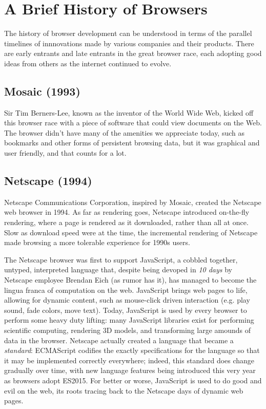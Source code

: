 \documentclass[a4paper, 11pt]{article} %
\begin{document}
\section{A Brief History of Browsers}

The history of browser development can be understood in terms of the parallel timelines of innnovations made by various companies and their products. There are early entrants and late entrants in the great browser race, each adopting good ideas from others as the internet continued to evolve. \cite{evolution-of-the-web}

\subsection{Mosaic (1993)}

Sir Tim Berners-Lee, known as the inventor of the World Wide Web, kicked off this browser race with a piece of software that could view documents on the Web. The browser didn't have many of the amenities we appreciate today, such as bookmarks and other forms of persistent browsing data, but it was graphical and user friendly, and that counts for a lot. \cite{Frequ89:online, evolution-of-the-web}

\subsection{Netscape (1994)}

Netscape Communications Corporation, inspired by Mosaic, created the Netscape web browser in 1994. As far as rendering goes, Netscape introduced on-the-fly rendering, where a page is rendered as it downloaded, rather than all at once. Slow as download speed were at the time, the incremental rendering of Netscape made browsing a more tolerable experience for 1990s users. \cite{Remem57:online}

The Netscape browser was first to support JavaScript, a cobbled together, untyped, interpreted language that, despite being devoped in \textit{10 days} by Netscape employee Brendan Eich (as rumor has it), has managed to become the lingua franca of computation on the web. JavaScript brings web pages to life, allowing for dynamic content, such as mouse-click driven interaction (e.g. play sound, fade colors, move text). Today, JavaScript is used by every browser to perform some heavy duty lifting: many JavaScript libraries exist for performing scientific computing, rendering 3D models, and transforming large amounds of data in the browser. Netscape actually created a language that became a \textit{standard}: ECMAScript codifies the exactly specifications for the language so that it may be implemented correctly everywhere; indeed, this standard does change gradually over time, with new language features being introduced this very year as browsers adopt ES2015. For better or worse, JavaScript is used to do good and evil on the web, its roots tracing back to the Netscape days of dynamic web pages. \cite{evolution-of-the-web}
\end{document}
